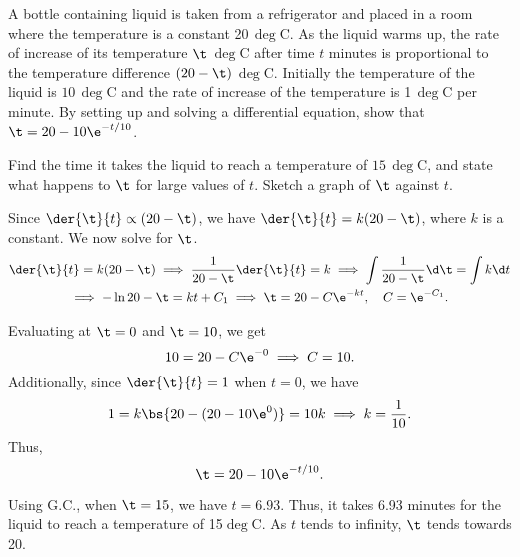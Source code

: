 \begin{problem}
    A bottle containing liquid is taken from a refrigerator and placed in a room where the temperature is a constant 20\,$\deg$C. As the liquid warms up, the rate of increase of its temperature $\t$\,$\deg$C after time $t$ minutes is proportional to the temperature difference $(20-\t)$\,$\deg$C. Initially the temperature of the liquid is $10$\,$\deg$C and the rate of increase of the temperature is 1\,$\deg$C per minute. By setting up and solving a differential equation, show that $\t = 20 - 10\e^{-t/10}$.

    Find the time it takes the liquid to reach a temperature of $15$\,$\deg$C, and state what happens to $\t$ for large values of $t$. Sketch a graph of $\t$ against $t$.
\end{problem}
\begin{solution}
    Since $\der{\t}{t} \propto (20 - \t)$, we have $\der{\t}{t} = k(20 - \t)$, where $k$ is a constant. We now solve for $\t$.
    \begin{gather*}
        \der{\t}{t} = k(20 - \t) \implies \frac1{20 - \t} \der{\t}{t} = k \implies \int \frac1{20 - \t} \d \t = \int k \d t \\
        \implies - \ln{20 - \t} = kt + C_1 \implies \t = 20 - C\e^{-kt}, \quad C = \e^{-C_1}.
    \end{gather*}

    Evaluating at $\t = 0$ and $\t = 10$, we get \[10 = 20 - C\e^{-0} \implies C = 10.\] Additionally, since $\der{\t}{t} = 1$ when $t = 0$, we have \[1 = k\bs{20 - (20 - 10\e^0)} = 10k \implies k = \frac1{10}.\] Thus, \[\t = 20 - 10\e^{-t/10}.\]

    Using G.C., when $\t = 15$, we have $t = 6.93$. Thus, it takes 6.93 minutes for the liquid to reach a temperature of 15$\deg$C. As $t$ tends to infinity, $\t$ tends towards 20.

    \begin{center}
    \end{center}
\end{solution}

